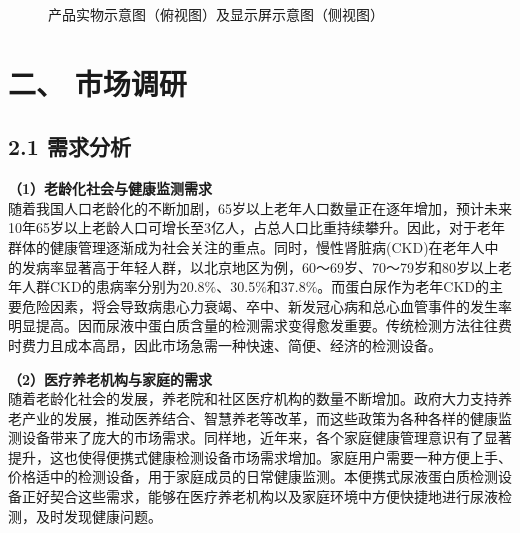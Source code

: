 \documentclass[a4paper,12pt]{article}
\begin{document}
\begin{figure}[H]
    \centering
    \caption{产品实物示意图（俯视图）及显示屏示意图（侧视图）}
\end{figure}

\section*{二、 市场调研}
\subsection*{2.1 需求分析}
\textbf{（1）老龄化社会与健康监测需求}\\
随着我国人口老龄化的不断加剧，65岁以上老年人口数量正在逐年增加，预计未来10年65岁以上老龄人口可增长至3亿人，占总人口比重持续攀升。因此，对于老年群体的健康管理逐渐成为社会关注的重点。同时，慢性肾脏病(CKD)在老年人中的发病率显著高于年轻人群，以北京地区为例，60～69岁、70～79岁和80岁以上老年人群CKD的患病率分别为20.8\%、30.5\%和37.8\%。而蛋白尿作为老年CKD的主要危险因素，将会导致病患心力衰竭、卒中、新发冠心病和总心血管事件的发生率明显提高。因而尿液中蛋白质含量的检测需求变得愈发重要。传统检测方法往往费时费力且成本高昂，因此市场急需一种快速、简便、经济的检测设备。

\textbf{（2）医疗养老机构与家庭的需求}\\
随着老龄化社会的发展，养老院和社区医疗机构的数量不断增加。政府大力支持养老产业的发展，推动医养结合、智慧养老等改革，而这些政策为各种各样的健康监测设备带来了庞大的市场需求。同样地，近年来，各个家庭健康管理意识有了显著提升，这也使得便携式健康检测设备市场需求增加。家庭用户需要一种方便上手、价格适中的检测设备，用于家庭成员的日常健康监测。本便携式尿液蛋白质检测设备正好契合这些需求，能够在医疗养老机构以及家庭环境中方便快捷地进行尿液检测，及时发现健康问题。
\end{document}
